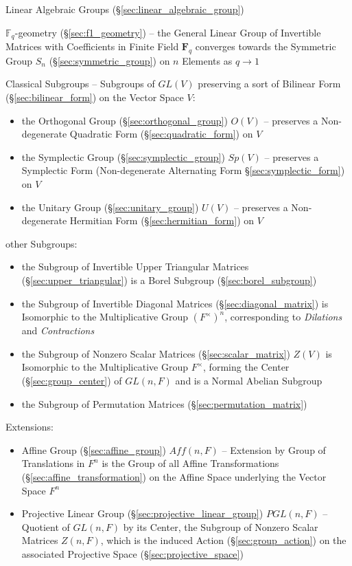\fist Linear Algebraic Groups (\S\ref{sec:linear_algebraic_group})

\fist $\mathbb{F}_q$-geometry (\S\ref{sec:f1_geometry}) -- the General Linear
Group of Invertible Matrices with Coefficients in Finite Field $\mathbf{F}_q$
converges towards the Symmetric Group $S_n$ (\S\ref{sec:symmetric_group}) on $n$
Elements as $q \rightarrow 1$

Classical Subgroups -- Subgroups of $GL(V)$ preserving a sort of Bilinear Form
(\S\ref{sec:bilinear_form}) on the Vector Space $V$:
\begin{itemize}
  \item the Orthogonal Group (\S\ref{sec:orthogonal_group}) $O(V)$ -- preserves
    a Non-degenerate Quadratic Form (\S\ref{sec:quadratic_form}) on $V$
  \item the Symplectic Group (\S\ref{sec:symplectic_group}) $Sp(V)$
    -- preserves a Symplectic Form (Non-degenerate Alternating Form
    \S\ref{sec:symplectic_form}) on $V$
  \item the Unitary Group (\S\ref{sec:unitary_group}) $U(V)$
    -- preserves a Non-degenerate Hermitian Form (\S\ref{sec:hermitian_form})
    on $V$
\end{itemize}

other Subgroups:
\begin{itemize}
  \item the Subgroup of Invertible Upper Triangular Matrices
    (\S\ref{sec:upper_triangular}) is a Borel Subgroup
    (\S\ref{sec:borel_subgroup})
  \item the Subgroup of Invertible Diagonal Matrices
    (\S\ref{sec:diagonal_matrix}) is Isomorphic to the Multiplicative Group
    $(F^\times)^n$, corresponding to \emph{Dilations} and \emph{Contractions}
  \item the Subgroup of Nonzero Scalar Matrices (\S\ref{sec:scalar_matrix})
    $Z(V)$ is Isomorphic to the Multiplicative Group $F^\times$, forming the
    Center (\S\ref{sec:group_center}) of $GL(n,F)$ and is a Normal Abelian
    Subgroup
  \item the Subgroup of Permutation Matrices (\S\ref{sec:permutation_matrix})
\end{itemize}

Extensions:
\begin{itemize}
  \item Affine Group (\S\ref{sec:affine_group}) $Aff(n,F)$ -- Extension by
    Group of Translations in $F^n$ is the Group of all Affine Transformations
    (\S\ref{sec:affine_transformation}) on the Affine Space underlying the
    Vector Space $F^n$
  \item Projective Linear Group (\S\ref{sec:projective_linear_group})
    $PGL(n,F)$ -- Quotient of $GL(n,F)$ by its Center, the Subgroup of Nonzero
    Scalar Matrices $Z(n,F)$, which is the induced Action
    (\S\ref{sec:group_action}) on the associated Projective Space
    (\S\ref{sec:projective_space})
\end{itemize}



